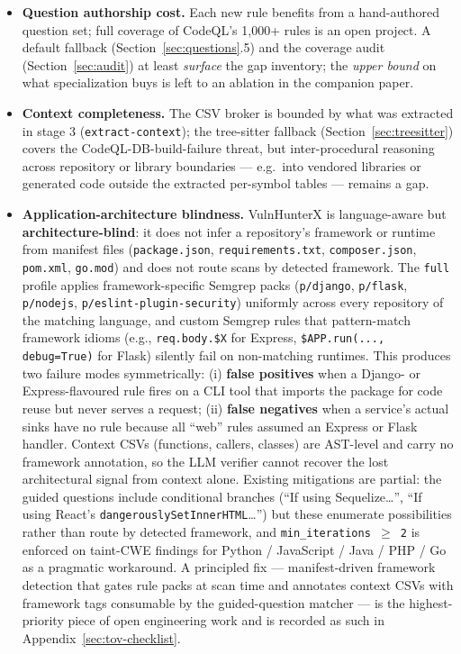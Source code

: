\documentclass[11pt,a4paper]{article}
\begin{document}
\begin{itemize}[leftmargin=*]
\item \textbf{Question authorship cost.} Each new rule benefits from a
  hand-authored question set; full coverage of CodeQL's 1{,}000+ rules
  is an open project. A default fallback
  (Section~\ref{sec:questions}.5) and the coverage audit
  (Section~\ref{sec:audit}) at least \emph{surface} the gap inventory;
  the \emph{upper bound} on what specialization buys is left to an
  ablation in the companion paper.

\item \textbf{Context completeness.} The CSV broker is bounded by what
  was extracted in stage 3 (\texttt{extract-context}); the tree-sitter
  fallback (Section~\ref{sec:treesitter}) covers the
  CodeQL-DB-build-failure threat, but inter-procedural reasoning
  across repository or library boundaries --- e.g.~into vendored
  libraries or generated code outside the extracted per-symbol tables
  --- remains a gap.

\item \textbf{Application-architecture blindness.} VulnHunterX is
  language-aware but \textbf{architecture-blind}: it does not infer a
  repository's framework or runtime from manifest files
  (\texttt{package.json}, \texttt{requirements.txt},
  \texttt{composer.json}, \texttt{pom.xml}, \texttt{go.mod}) and does
  not route scans by detected framework. The \texttt{full} profile
  applies framework-specific Semgrep packs (\texttt{p/django},
  \texttt{p/flask}, \texttt{p/nodejs},
  \texttt{p/eslint-plugin-security}) uniformly across every repository
  of the matching language, and custom Semgrep rules that
  pattern-match framework idioms (e.g., \verb|req.body.$X| for
  Express, \verb|$APP.run(..., debug=True)| for Flask) silently fail
  on non-matching runtimes. This produces two failure modes
  symmetrically: (i) \textbf{false positives} when a Django- or
  Express-flavoured rule fires on a CLI tool that imports the package
  for code reuse but never serves a request; (ii) \textbf{false
  negatives} when a service's actual sinks have no rule because all
  ``web'' rules assumed an Express or Flask handler. Context CSVs
  (functions, callers, classes) are AST-level and carry no framework
  annotation, so the LLM verifier cannot recover the lost
  architectural signal from context alone. Existing mitigations are
  partial: the guided questions include conditional branches (``If
  using Sequelize\ldots'', ``If using React's
  \texttt{dangerouslySetInnerHTML}\ldots'') but these enumerate
  possibilities rather than route by detected framework, and
  \texttt{min\_iterations $\geq$ 2} is enforced on taint-CWE findings
  for Python / JavaScript / Java / PHP / Go as a pragmatic workaround.
  A principled fix --- manifest-driven framework detection that gates
  rule packs at scan time and annotates context CSVs with framework
  tags consumable by the guided-question matcher --- is the
  highest-priority piece of open engineering work and is recorded as
  such in Appendix~\ref{sec:tov-checklist}.
\end{itemize}
\end{document}
